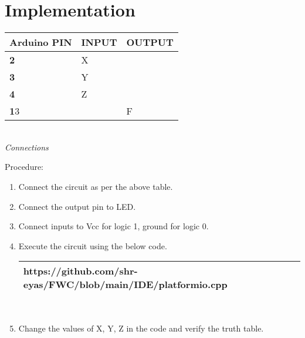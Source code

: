\documentclass[journal,12pt]{IEEEtran}
\begin{document}
\section{Implementation}
\vspace{20pt}
\begin{center}
  \begin{tabularx}{0.46\textwidth} { 
  | >{\centering\arraybackslash}X 
  | >{\centering\arraybackslash}X 
  | >{\centering\arraybackslash}X  | }
\hline
\textbf{Arduino PIN} & \textbf{INPUT} & \textbf{OUTPUT} \\ 
\hline
\textbf 2 & X & \\
\hline
\textbf 3 & Y & \\
\hline
\textbf 4 & Z & \\
\hline
\textbf 13 & & F \\
\hline
\end{tabularx}
\vspace{6pt}
\\\textit{Connections}
\end{center}

\begin{flushleft}

Procedure:\\
\begin{enumerate}[label=\alph*.,labelindent=\parindent,leftmargin=*]
    \item Connect the circuit as per the above table.
    \vspace{2pt}
    \item Connect the output pin to LED.
    \vspace{2pt}
    \item Connect inputs to Vcc for logic 1, ground for logic 0.
    \vspace{2pt}
    \item Execute the circuit using the below code.
    \\
    \vspace{7pt}
    \begin{tabularx}{0.52\textwidth} { 
    | >{\centering\arraybackslash}X |}
    \hline
    https://github.com/shr-eyas/FWC/blob/main/IDE/platformio.cpp\\
    \hline
    \end{tabularx}
    \\
    \vspace{10pt}
    \item Change the values of X, Y, Z in the code and verify the truth table.\\
    
\end{enumerate}
\end{flushleft}


\end{document}
